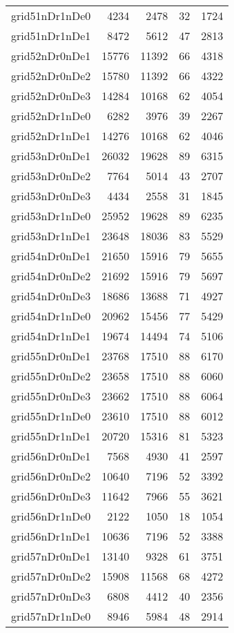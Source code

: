 \begin{longtable}{lrrrr}
grid51nDr1nDe0 & 4234 & 2478 & 32 & 1724 \\
grid51nDr1nDe1 & 8472 & 5612 & 47 & 2813 \\
grid52nDr0nDe1 & 15776 & 11392 & 66 & 4318 \\
grid52nDr0nDe2 & 15780 & 11392 & 66 & 4322 \\
grid52nDr0nDe3 & 14284 & 10168 & 62 & 4054 \\
grid52nDr1nDe0 & 6282 & 3976 & 39 & 2267 \\
grid52nDr1nDe1 & 14276 & 10168 & 62 & 4046 \\
grid53nDr0nDe1 & 26032 & 19628 & 89 & 6315 \\
grid53nDr0nDe2 & 7764 & 5014 & 43 & 2707 \\
grid53nDr0nDe3 & 4434 & 2558 & 31 & 1845 \\
grid53nDr1nDe0 & 25952 & 19628 & 89 & 6235 \\
grid53nDr1nDe1 & 23648 & 18036 & 83 & 5529 \\
grid54nDr0nDe1 & 21650 & 15916 & 79 & 5655 \\
grid54nDr0nDe2 & 21692 & 15916 & 79 & 5697 \\
grid54nDr0nDe3 & 18686 & 13688 & 71 & 4927 \\
grid54nDr1nDe0 & 20962 & 15456 & 77 & 5429 \\
grid54nDr1nDe1 & 19674 & 14494 & 74 & 5106 \\
grid55nDr0nDe1 & 23768 & 17510 & 88 & 6170 \\
grid55nDr0nDe2 & 23658 & 17510 & 88 & 6060 \\
grid55nDr0nDe3 & 23662 & 17510 & 88 & 6064 \\
grid55nDr1nDe0 & 23610 & 17510 & 88 & 6012 \\
grid55nDr1nDe1 & 20720 & 15316 & 81 & 5323 \\
grid56nDr0nDe1 & 7568 & 4930 & 41 & 2597 \\
grid56nDr0nDe2 & 10640 & 7196 & 52 & 3392 \\
grid56nDr0nDe3 & 11642 & 7966 & 55 & 3621 \\
grid56nDr1nDe0 & 2122 & 1050 & 18 & 1054 \\
grid56nDr1nDe1 & 10636 & 7196 & 52 & 3388 \\
grid57nDr0nDe1 & 13140 & 9328 & 61 & 3751 \\
grid57nDr0nDe2 & 15908 & 11568 & 68 & 4272 \\
grid57nDr0nDe3 & 6808 & 4412 & 40 & 2356 \\
grid57nDr1nDe0 & 8946 & 5984 & 48 & 2914 \\

\end{longtable}
